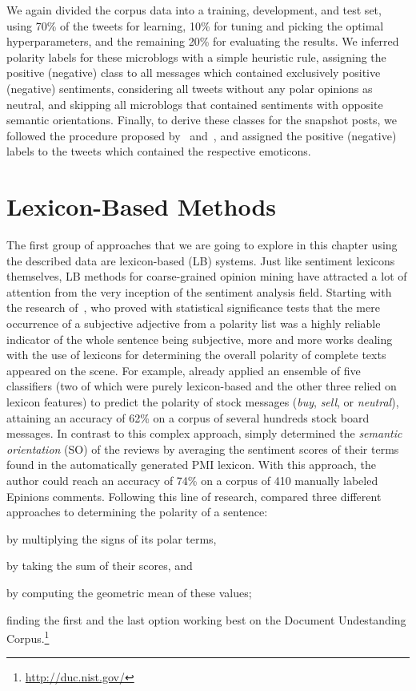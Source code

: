 We again divided the corpus data into a training, development, and
test set, using 70\% of the tweets for learning, 10\% for tuning and
picking the optimal hyperparameters, and the remaining 20\% for
evaluating the results.  We inferred polarity labels for these
microblogs with a simple heuristic rule, assigning the positive
(negative) class to all messages which contained exclusively positive
(negative) sentiments, considering all tweets without any polar
opinions as neutral, and skipping all microblogs that contained
sentiments with opposite semantic orientations.  Finally, to derive
these classes for the snapshot posts, we followed the procedure
proposed by~\citet{Read:05} and~\citet{Go:09}, and assigned the
positive (negative) labels to the tweets which contained the
respective emoticons.


\section{Lexicon-Based Methods}\label{sec:cgsa:lexicon-based}

The first group of approaches that we are going to explore in this
chapter using the described data are lexicon-based (LB) systems.  Just
like sentiment lexicons themselves, LB methods for coarse-grained
opinion mining have attracted a lot of attention from the very
inception of the sentiment analysis field.  Starting with the research
of~\citet{Hatzivassi:00}, who proved with statistical significance
tests that the mere occurrence of a subjective adjective from a
polarity list was a highly reliable indicator of the whole sentence
being subjective, more and more works dealing with the use of lexicons
for determining the overall polarity of complete texts appeared on the
scene.  For example, \citet{Das:01} already applied an ensemble of
five classifiers (two of which were purely lexicon-based and the other
three relied on lexicon features) to predict the polarity of stock
messages (\emph{buy}, \emph{sell}, or \emph{neutral}), attaining an
accuracy of 62\% on a corpus of several hundreds stock board messages.
In contrast to this complex approach, \citet{Turney:02} simply
determined the \emph{semantic orientation} (SO) of the reviews by
averaging the sentiment scores of their terms found in the
automatically generated PMI lexicon.  With this approach, the author
could reach an accuracy of 74\% on a corpus of 410 manually labeled
Epinions comments.  Following this line of research, \citet{Kim:04}
compared three different approaches to determining the polarity of a
sentence:
\begin{inparaenum}[(i)]
\item by multiplying the signs of its polar terms,
\item by taking the sum of their scores, and
\item by computing the geometric mean of these values;
\end{inparaenum}
finding the first and the last option working best on the Document
Undestanding Corpus.\footnote{\url{http://duc.nist.gov/}}


